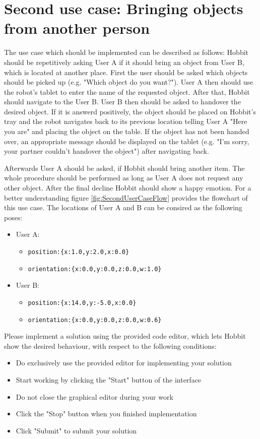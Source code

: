 \documentclass[a4paper,12pt]{article}
\begin{document}
\section*{Second use case: Bringing objects from another person}
The use case which should be implemented can be described as follows: Hobbit should be repetitively asking User A if it should bring an object from User B, which is located at another place. First the user should be asked which objects should be picked up (e.g. "Which object do you want?"). User A then should use the robot’s tablet to enter the name of the requested object. After that, Hobbit should navigate to the User B. User B then should be asked to handover the desired object. If it is answerd positively, the object should be placed on Hobbit's tray and the robot navigates back to its previous location telling User A "Here you are" and placing the object on the table. If the object has not been handed over, an appropriate message should be displayed on the tablet (e.g. "I’m sorry, your partner couldn’t handover the object") after navigating back.

Afterwards User A should be asked, if Hobbit should bring another item. The whole procedure should be performed as long as User A does not request any other object. After the final decline Hobbit should show a happy emotion. For a better understanding figure \ref{fig:SecondUserCaseFlow} provides the flowchart of this use case. The locations of User A and B can be consired as the following poses:

\begin{itemize}
    \item User A:
    \begin{itemize}
        \item \lstinline!position:{x:1.0,y:2.0,x:0.0}!
        \item \lstinline!orientation:{x:0.0,y:0.0,z:0.0,w:1.0}!
    \end{itemize}
    \item User B:
    \begin{itemize}
        \item \lstinline!position:{x:14.0,y:-5.0,x:0.0}!
        \item \lstinline!orientation:{x:0.0,y:0.0,z:0.0,w:0.6}!
    \end{itemize}
\end{itemize}

Please implement a solution using the provided code editor, which lets Hobbit show the desired behaviour, with respect to the following conditions:
\begin{itemize}
    \item Do exclusively use the provided editor for implementing your solution
    \item Start working by clicking the "Start" button of the interface
    \item Do not close the graphical editor during your work
    \item Click the "Stop" button when you finished implementation
    \item Click "Submit" to submit your solution
\end{itemize}
\end{document}
